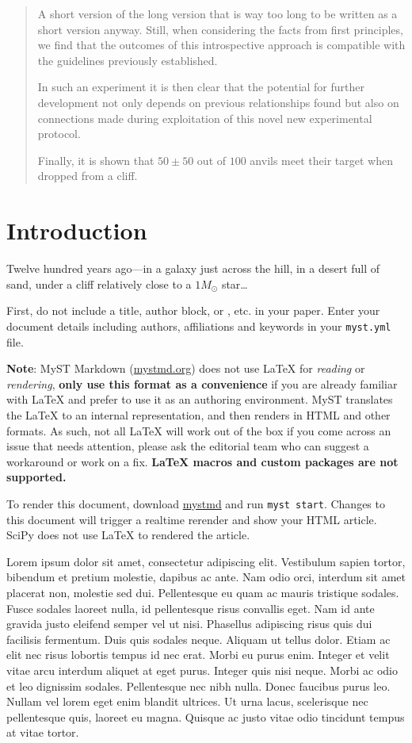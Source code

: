 \begin{abstract}
   A short version of the long version that is way too long to be written as a short version anyway.
   Still, when considering the facts from first principles, we find that the outcomes of this introspective approach
   is compatible with the guidelines previously established.

   In such an experiment it is then clear that the potential for further development not only depends on previous
   relationships found but also on connections made during exploitation of this novel new experimental protocol.

    Finally, it is shown that $50 \pm 50$ out of $100$ anvils meet their target when dropped from a cliff.
\end{abstract}

\section{Introduction}\label{introduction}

Twelve hundred years ago—in a galaxy just across the hill, in a desert full of sand, under a cliff relatively close to
a $1 M_{\odot}$ star\ldots

First, do not include a title, author block, or \verb||, etc.
in your paper. Enter your document details including authors, affiliations and keywords in your \texttt{myst.yml} file.

\textbf{Note}: MyST Markdown (\href{https://mystmd.org}{mystmd.org}) does not use
LaTeX for \emph{reading} or \emph{rendering}, \textbf{only use this format as a convenience} if you are
already familiar with LaTeX and prefer to use it as an authoring environment.
MyST translates the LaTeX to an internal representation, and then renders in HTML and other formats.
As such, not all LaTeX will work out of the box if you come across an issue that needs attention,
please ask the editorial team who can suggest a workaround or work on a fix.
\textbf{LaTeX macros and custom packages are not supported.}

To render this document, download \href{https://mystmd.org/guide/quickstart}{mystmd} and run \texttt{myst start}.
Changes to this document will trigger a realtime rerender and show your HTML article.
SciPy does not use LaTeX to rendered the article.

Lorem ipsum dolor sit amet, consectetur adipiscing elit. Vestibulum sapien
tortor, bibendum et pretium molestie, dapibus ac ante. Nam odio orci, interdum
sit amet placerat non, molestie sed dui. Pellentesque eu quam ac mauris
tristique sodales. Fusce sodales laoreet nulla, id pellentesque risus convallis
eget. Nam id ante gravida justo eleifend semper vel ut nisi. Phasellus
adipiscing risus quis dui facilisis fermentum. Duis quis sodales neque. Aliquam
ut tellus dolor. Etiam ac elit nec risus lobortis tempus id nec erat. Morbi eu
purus enim. Integer et velit vitae arcu interdum aliquet at eget purus. Integer
quis nisi neque. Morbi ac odio et leo dignissim sodales. Pellentesque nec nibh
nulla. Donec faucibus purus leo. Nullam vel lorem eget enim blandit ultrices.
Ut urna lacus, scelerisque nec pellentesque quis, laoreet eu magna. Quisque ac
justo vitae odio tincidunt tempus at vitae tortor.

